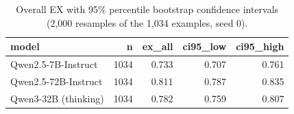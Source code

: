 \begin{table}[htbp]
\caption{Overall EX with 95\% percentile bootstrap confidence intervals (2,000 resamples of the 1,034 examples, seed 0).}
\label{tab:task1_ex_ci}
\begin{tabular}{lrrrr}
\toprule
model & n & ex\_all & ci95\_low & ci95\_high \\
\midrule
Qwen2.5-7B-Instruct & 1034 & 0.733 & 0.707 & 0.761 \\
Qwen2.5-72B-Instruct & 1034 & 0.811 & 0.787 & 0.835 \\
Qwen3-32B (thinking) & 1034 & 0.782 & 0.759 & 0.807 \\
\bottomrule
\end{tabular}
\end{table}
